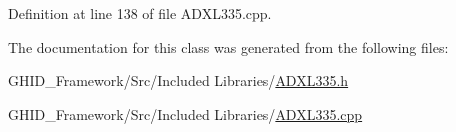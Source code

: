 \-Definition at line 138 of file \-A\-D\-X\-L335.\-cpp.



\-The documentation for this class was generated from the following files\-:\begin{DoxyCompactItemize}
\item 
\-G\-H\-I\-D\-\_\-\-Framework/\-Src/\-Included Libraries/\hyperlink{_a_d_x_l335_8h}{\-A\-D\-X\-L335.\-h}\item 
\-G\-H\-I\-D\-\_\-\-Framework/\-Src/\-Included Libraries/\hyperlink{_a_d_x_l335_8cpp}{\-A\-D\-X\-L335.\-cpp}\end{DoxyCompactItemize}
